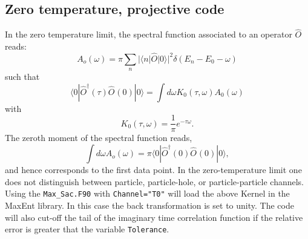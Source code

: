 \subsection{Zero temperature, projective code}

 In the zero temperature limit,  the spectral function associated to an operator $\hat{O} $    reads:
 \begin{equation}
 	  A_o(\omega)    = \pi  \sum_{n}    | \langle n  | \hat{O} | 0 \rangle |^2 \delta( E_n - E_0 - \omega) 
 \end{equation}
 such that 
 \begin{equation}
 	\langle 0 | \hat{O}^{\dagger}(\tau) \hat{O}^{}(0) | 0 \rangle =  \int d  \omega  K_0(\tau,\omega) A_0(\omega) 
 \end{equation}
 with 
 \begin{equation}
 	K_0(\tau,\omega)  = \frac{1}{\pi}e^{-\tau \omega}.
 \end{equation}
 The zeroth moment of the spectral function reads, 
 \begin{equation}
  \int d \omega A_o(\omega) = \pi \langle 0 | \hat{O}^{\dagger}(0) \hat{O}^{}(0) | 0 \rangle, 
 \end{equation}
 and hence corresponds to the first data point. 
 In the zero-temperature limit one does not distinguish between  particle, particle-hole, or particle-particle channels.
 Using the \texttt{Max\_Sac.F90}  with \texttt{Channel="T0"}   will  load the above Kernel in the MaxEnt library. In this case the back  transformation is set to unity. 
 The code will also cut-off the tail of the  imaginary time correlation function  if the relative error is greater that the variable \texttt{Tolerance}. 
